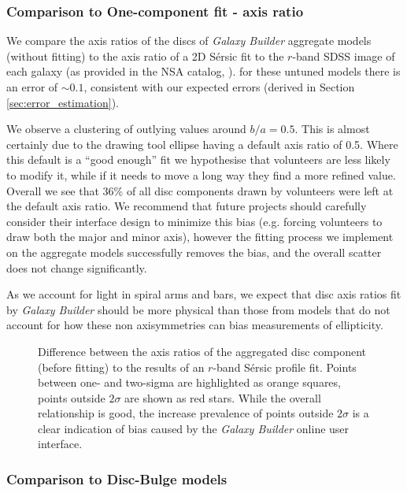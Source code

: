\documentclass[trackchanges]{aastex63}
\begin{document}
\subsubsection{Comparison to One-component fit - axis ratio}

We compare the axis ratios of the discs of \textit{Galaxy Builder} aggregate models (without fitting) to the axis ratio of a 2D S\'ersic fit to the $r$-band SDSS image of each galaxy (as provided in the NSA catalog, \citealt{2011AJ....142...31B}).  for these untuned models there is an error of $\sim0.1$, consistent with our expected errors (derived in Section \ref{sec:error_estimation}).

We observe a clustering of outlying values around $b/a=0.5$. This is almost certainly due to the drawing tool ellipse having a default axis ratio of 0.5. Where this default is a ``good enough'' fit we hypothesise that volunteers are less likely to modify it, while if it needs to move a long way they find a more refined value. Overall we see that 36\% of all disc components drawn by volunteers were left at the default axis ratio. We recommend that future projects should carefully consider their interface design to minimize this bias (e.g. forcing volunteers to draw both the major and minor axis), however the fitting process we implement on the aggregate models successfully removes the bias, and the overall scatter does not change significantly.

As we account for light in spiral arms and bars, we expect that disc axis ratios fit by \textit{Galaxy Builder} should be more physical than those from models that do not account for how these non axisymmetries can bias measurements of ellipticity.

\begin{figure}
  \caption{Difference between the axis ratios of the aggregated disc component (before fitting) to the results of an $r$-band S\'ersic profile fit. Points  between one- and two-sigma are highlighted as orange squares, points outside $2\sigma$ are shown as red stars. While the overall relationship is good, the increase prevalence of points outside $2\sigma$ is a clear indication of bias caused by the \textit{Galaxy Builder} online user interface.}
  \label{fig:ax_ratio_comparison}
\end{figure}


\subsubsection{Comparison to Disc-Bulge models}
\end{document}
